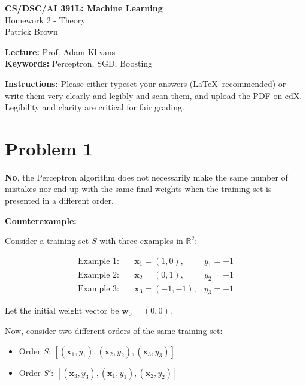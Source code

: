 \documentclass{article}
\begin{document}
\begin{center}
    \Large\textbf{CS/DSC/AI 391L: Machine Learning}\\
    \large Homework 2 - Theory\\
    \normalsize Patrick Brown
\end{center}

\noindent\textbf{Lecture:} Prof. Adam Klivans\\
\textbf{Keywords:} Perceptron, SGD, Boosting
\vspace{1cm}

\textbf{Instructions:} Please either typeset your answers (\LaTeX\ recommended) or write them very clearly and legibly and scan them, and upload the PDF on edX. Legibility and clarity are critical for fair grading.

\vspace{1cm}

\section*{Problem 1}

\textbf{No}, the Perceptron algorithm does not necessarily make the same number of mistakes nor end up with the same final weights when the training set is presented in a different order.

\bigskip

\textbf{Counterexample:}

Consider a training set \( S \) with three examples in \( \mathbb{R}^2 \):

\begin{align*}
    \text{Example 1:} &\quad \mathbf{x}_1 = (1, 0), & y_1 = +1 \\
    \text{Example 2:} &\quad \mathbf{x}_2 = (0, 1), & y_2 = +1 \\
    \text{Example 3:} &\quad \mathbf{x}_3 = (-1, -1), & y_3 = -1
\end{align*}

Let the initial weight vector be \( \mathbf{w}_0 = (0, 0) \).

Now, consider two different orders of the same training set:

\begin{itemize}
    \item Order \( S \): \([(\mathbf{x}_1, y_1), (\mathbf{x}_2, y_2), (\mathbf{x}_3, y_3)]\)
    \item Order \( S' \): \([(\mathbf{x}_3, y_3), (\mathbf{x}_1, y_1), (\mathbf{x}_2, y_2)]\)
\end{itemize}
\end{document}
